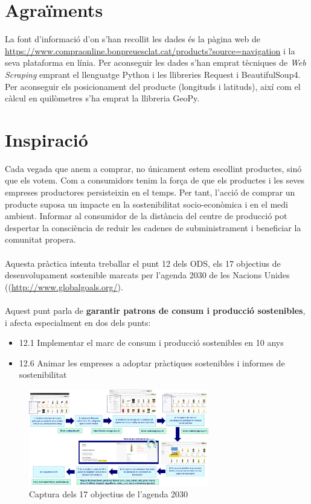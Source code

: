 \documentclass[]{scrartcl}
\begin{document}
\section{Agraïments}
La font d'informació d'on s'han recollit les dades és la pàgina web de \url{https://www.compraonline.bonpreuesclat.cat/products?source=navigation} i la seva plataforma en línia.  
Per aconseguir les dades s'han emprat tècniques de \textit{Web Scraping} emprant el llenguatge Python i les llibreries Request i BeautifulSoup4. Per aconseguir els posicionament del producte (longituds i latituds), així com el càlcul en quilòmetres s'ha emprat la llibreria GeoPy.


\section{Inspiració}
Cada vegada que anem a comprar, no únicament estem escollint productes, sinó que els votem. Com a consumidors tenim la força de que els productes i les seves empreses productores persisteixin en el temps. Per tant, l'acció de comprar un producte suposa un impacte en la sostenibilitat socio-econòmica i en el medi ambient. Informar al consumidor de la distància del centre de producció pot despertar la consciència de reduir les  cadenes de subministrament i beneficiar la comunitat propera.
\\\\
Aquesta pràctica intenta treballar el punt 12 dels ODS, els 17 objectius de desenvolupament sostenible marcats per l'agenda 2030 de les Nacions Unides ((\url{http://www.globalgoals.org/}).
\\\\
Aquest punt parla de \textbf{garantir patrons de consum i producció sostenibles}, i afecta especialment en dos dels punts:
\begin{itemize}
	\item 12.1 Implementar el marc de consum i producció sostenibles en 10 anys
	\item 12.6 Animar les empreses a adoptar pràctiques sostenibles i informes de sostenibilitat
\end{itemize} 
\begin{figure}[htb]
	\centering
	\includegraphics[width=0.7\textwidth]{../img/infographic_productesProximitatScraper_procediment}
	\caption{Captura dels 17 objectius de l'agenda 2030}
\end{figure}
\end{document}
